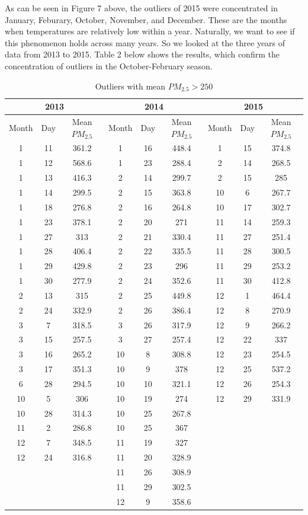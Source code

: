 \documentclass[11pt]{article} %
\begin{document}
As can be seen in Figure 7 above, the outliers of 2015 were concentrated in January, Feburary, October, November, and December. These are the months when temperatures are relatively low within a year. Naturally, we want to see if this phenomenon holds across many years. So we looked at the three years of data from 2013 to 2015. Table 2 below shows the results, which confirm the concentration of outliers in the October-February season.

\begin{table}[t]
\begin{tabular}{| ccc | ccc | ccc |}
\hline
\multicolumn{3}{|c|}{2013} & 
\multicolumn{3}{|c|}{2014} &
\multicolumn{3}{|c|}{2015} \\ \hline
Month & Day & Mean \(PM_{2.5}\) & 
Month & Day & Mean \(PM_{2.5}\) &
Month & Day & Mean \(PM_{2.5}\) \\ \hline
1 & 11 & 361.2 &1 & 16 & 448.4 &1 & 15 & 374.8 \\
1 & 12 & 568.6 &1 & 23 & 288.4 &2 & 14 & 268.5  \\
1 & 13 & 416.3 &2 & 14 & 299.7 &2 & 15 & 285  \\
1 & 14 & 299.5 &2 & 15 & 363.8 &10 & 6 & 267.7 \\
1 & 18 & 276.8 &2 & 16 & 264.8 &10 & 17 & 302.7  \\
1 & 23 & 378.1 &2 & 20 & 271 &11 & 14 & 259.3  \\
1 & 27 & 313 &2 & 21 & 330.4 &11 & 27 & 251.4  \\
1 & 28 & 406.4 &2 & 22 & 335.5 &11 & 28 & 300.5  \\
1 & 29 & 429.8 &2 & 23 & 296 &11 & 29 & 253.2 \\
1 & 30 & 277.9 &2 & 24 & 352.6 &11 & 30 & 412.8  \\ 
2 & 13 & 315 &2 & 25 & 449.8 &12 & 1 & 464.4  \\
2 & 24 & 332.9 &2 & 26 & 386.4 &12 & 8 & 270.9   \\
3 & 7 & 318.5&3 & 26 & 317.9 &12 & 9 & 266.2  \\
3 & 15 & 257.5 &3 & 27 & 257.4 &12 & 22 & 337   \\
3 & 16 & 265.2 &10 & 8 & 308.8&12 & 23 & 254.5  \\
3 & 17 & 351.3 &10  & 9 & 378 &12 & 25 & 537.2   \\
6 & 28 & 294.5 &10 & 10 & 321.1 &12 & 26 & 254.3  \\
10 & 5 & 306 &10  & 19 & 274 &12 & 29 & 331.9  \\
10  & 28 & 314.3 &10 & 25 & 267.8 &&& \\
11 & 2 & 286.8 &10  & 25 & 367 &&& \\
12 & 7 & 348.5  &11 & 19 & 327 &&& \\
12 & 24 & 316.8 &11 & 20 & 328.9 &&& \\
&&&11 & 26 & 308.9 &&& \\
&&&11 & 29 & 302.5 &&& \\
&&&12 & 9 & 358.6 &&& \\
\hline
\end{tabular}
\caption{Outliers with mean \(PM_{2.5} > 250\)}
\end{table}
\end{document}
